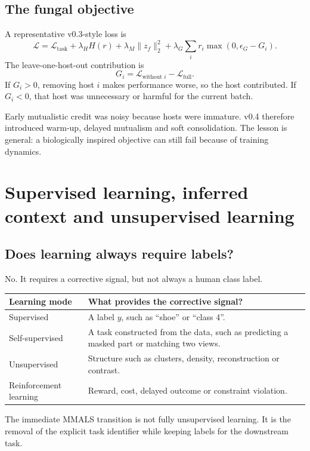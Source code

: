 \documentclass[11pt,a4paper]{article}
\newcommand{\tablehead}[1]{\cellcolor{DeepTeal}\color{white}\bfseries #1}
\begin{document}
\subsection{The fungal objective}

A representative v0.3-style loss is
\[
\mathcal{L}=\mathcal{L}_{\text{task}}
+\lambda_H H(r)
+\lambda_M\|z_f\|_2^2
+\lambda_G\sum_i r_i\max(0,\epsilon_G-G_i).
\]
The leave-one-host-out contribution is
\[
G_i=\mathcal{L}_{\text{without }i}-\mathcal{L}_{\text{full}}.
\]
If $G_i>0$, removing host $i$ makes performance worse, so the host contributed. If $G_i<0$, that host was unnecessary or harmful for the current batch.

\begin{researchbox}
Early mutualistic credit was noisy because hosts were immature. v0.4 therefore introduced warm-up, delayed mutualism and soft consolidation. The lesson is general: a biologically inspired objective can still fail because of training dynamics.
\end{researchbox}

\newpage
\section{Supervised learning, inferred context and unsupervised learning}

\subsection{Does learning always require labels?}

No. It requires a corrective signal, but not always a human class label.

\begin{tabularx}{\textwidth}{>{\raggedright\arraybackslash}p{3cm}X}
\toprule
\tablehead{Learning mode} & \tablehead{What provides the corrective signal?}\\
\midrule
Supervised & A label $y$, such as ``shoe'' or ``class 4''.\\
Self-supervised & A task constructed from the data, such as predicting a masked part or matching two views.\\
Unsupervised & Structure such as clusters, density, reconstruction or contrast.\\
Reinforcement learning & Reward, cost, delayed outcome or constraint violation.\\
\bottomrule
\end{tabularx}

The immediate MMALS transition is not fully unsupervised learning. It is the removal of the explicit task identifier while keeping labels for the downstream task.
\end{document}

